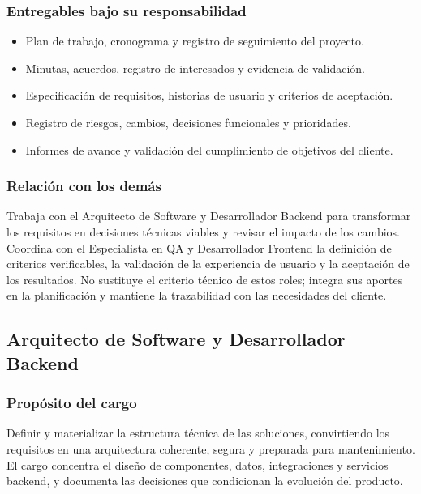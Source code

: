 \subsubsection{Entregables bajo su responsabilidad}
\begin{itemize}
  \item Plan de trabajo, cronograma y registro de seguimiento del proyecto.
  \item Minutas, acuerdos, registro de interesados y evidencia de validación.
  \item Especificación de requisitos, historias de usuario y criterios de aceptación.
  \item Registro de riesgos, cambios, decisiones funcionales y prioridades.
  \item Informes de avance y validación del cumplimiento de objetivos del cliente.
\end{itemize}

\subsubsection{Relación con los demás}

Trabaja con el Arquitecto de Software y Desarrollador Backend para transformar los
requisitos en decisiones técnicas viables y revisar el impacto de los cambios.
Coordina con el Especialista en QA y Desarrollador Frontend la definición de
criterios verificables, la validación de la experiencia de usuario y la
aceptación de los resultados. No sustituye el criterio técnico de estos roles;
integra sus aportes en la planificación y mantiene la trazabilidad con las
necesidades del cliente.

\subsection{Arquitecto de Software y Desarrollador Backend}

\begin{nota}
\lgArquitecto
\end{nota}

\subsubsection{Propósito del cargo}

Definir y materializar la estructura técnica de las soluciones, convirtiendo los
requisitos en una arquitectura coherente, segura y preparada para mantenimiento.
El cargo concentra el diseño de componentes, datos, integraciones y servicios
backend, y documenta las decisiones que condicionan la evolución del producto.

